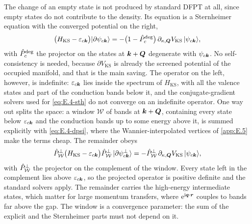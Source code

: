 The change of an empty state is not produced by standard DFPT at all, since empty states do not contribute to the density. Its equation is a Sternheimer equation with the converged potential on the right,
\begin{equation}
  \bigl(H_{\mathrm{KS}} - \varepsilon_{c\bm{k}}\bigr)|\partial\psi_{c\bm{k}}\rangle = -\bigl(1 - \hat{P}^{\mathrm{deg}}_{c}\bigr)\,\partial_{\kappa,\bm{Q}}V_{\mathrm{KS}}\,|\psi_{c\bm{k}}\rangle ,
  \label{eq:E.4-dpsic}
\end{equation}
with $\hat{P}^{\mathrm{deg}}_{c}$ the projector on the states at $\bm{k}+\bm{Q}$ degenerate with $\psi_{c\bm{k}}$. No self-consistency is needed, because $\partial V_{\mathrm{KS}}$ is already the screened potential of the occupied manifold, and that is the main saving. The operator on the left, however, is indefinite: $\varepsilon_{c\bm{k}}$ lies inside the spectrum of $H_{\mathrm{KS}}$, with all the valence states and part of the conduction bands below it, and the conjugate-gradient solvers used for \cref{eq:E.4-sth} do not converge on an indefinite operator. One way out splits the space: a window $\mathcal{W}$ of bands at $\bm{k}+\bm{Q}$, containing every state below $\varepsilon_{c\bm{k}}$ and the conduction bands up to some energy above it, is summed explicitly with \cref{eq:E.4-dpsi}, where the Wannier-interpolated vertices of \cref{app:E.5} make the terms cheap. The remainder obeys
\begin{equation}
  \hat{P}^{\perp}_{\mathcal{W}}\bigl(H_{\mathrm{KS}} - \varepsilon_{c\bm{k}}\bigr)\hat{P}^{\perp}_{\mathcal{W}}\,|\partial\psi^{\perp}_{c\bm{k}}\rangle = -\hat{P}^{\perp}_{\mathcal{W}}\,\partial_{\kappa,\bm{Q}}V_{\mathrm{KS}}\,|\psi_{c\bm{k}}\rangle ,
  \label{eq:E.4-dpsiperp}
\end{equation}
with $\hat{P}^{\perp}_{\mathcal{W}}$ the projector on the complement of the window. Every state left in the complement lies above $\varepsilon_{c\bm{k}}$, so the projected operator is positive definite and the standard solvers apply. The remainder carries the high-energy intermediate states, which matter for large momentum transfers, where $\mathrm{e}^{\mathrm{i}\bm{q}\cdot\bm{r}}$ couples to bands far above the gap. The window is a convergence parameter: the sum of the explicit and the Sternheimer parts must not depend on it.


